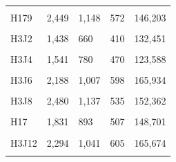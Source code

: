 \documentclass[
  a4paper,
  titlepage]{article}
\begin{document}
\begin{longtable}[t]{lllll}
\cellcolor{gray!6}{H16} & \cellcolor{gray!6}{2,154} & \cellcolor{gray!6}{1,040} & \cellcolor{gray!6}{633} & \cellcolor{gray!6}{176,088}\\
 
H179 & 2,449 & 1,148 & 572 & 146,203\\
 
\cellcolor{gray!6}{H3J1} & \cellcolor{gray!6}{2,085} & \cellcolor{gray!6}{960} & \cellcolor{gray!6}{485} & \cellcolor{gray!6}{134,711}\\
 
H3J2 & 1,438 & 660 & 410 & 132,451\\
 
\cellcolor{gray!6}{H3J3} & \cellcolor{gray!6}{1,762} & \cellcolor{gray!6}{815} & \cellcolor{gray!6}{452} & \cellcolor{gray!6}{114,300}\\
 
H3J4 & 1,541 & 780 & 470 & 123,588\\
 
\cellcolor{gray!6}{H3J5} & \cellcolor{gray!6}{3,516} & \cellcolor{gray!6}{1,515} & \cellcolor{gray!6}{798} & \cellcolor{gray!6}{206,814}\\
 
H3J6 & 2,188 & 1,007 & 598 & 165,934\\
 
\cellcolor{gray!6}{H3J7} & \cellcolor{gray!6}{3,111} & \cellcolor{gray!6}{1,378} & \cellcolor{gray!6}{671} & \cellcolor{gray!6}{180,398}\\
 
H3J8 & 2,480 & 1,137 & 535 & 152,362\\
 
\cellcolor{gray!6}{H3J10} & \cellcolor{gray!6}{1,798} & \cellcolor{gray!6}{872} & \cellcolor{gray!6}{512} & \cellcolor{gray!6}{138,325}\\
 
H17 & 1,831 & 893 & 507 & 148,701\\
 
\cellcolor{gray!6}{H3J11} & \cellcolor{gray!6}{2,761} & \cellcolor{gray!6}{1,247} & \cellcolor{gray!6}{635} & \cellcolor{gray!6}{157,976}\\
 
H3J12 & 2,294 & 1,041 & 605 & 165,674\\
 
\cellcolor{gray!6}{H3J13} & \cellcolor{gray!6}{2,735} & \cellcolor{gray!6}{1,220} & \cellcolor{gray!6}{625} & \cellcolor{gray!6}{166,183}\\
 

\end{longtable}
\end{document}
